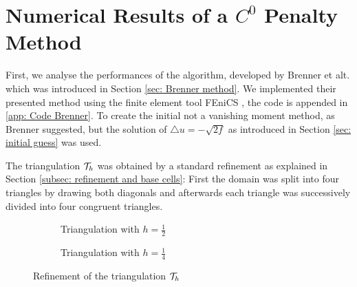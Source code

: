 
\section{Numerical Results of a $C^0$ Penalty Method}\label{sec: numerical results brenner}



First, we analyse the performances of the algorithm, developed by Brenner et alt. \cite{BGN+2011} which was introduced in Section \ref{sec: Brenner method}.
We implemented their presented method using the finite element tool FEniCS \cite{FEniCS}, the code is appended in \ref{app: Code Brenner}. 
To create the initial not a vanishing moment method, as Brenner suggested, but the solution of $\triangle u = -\sqrt{2f}$ as introduced in Section \ref{sec: initial guess} was used. 

The triangulation $\mathcal{T}_h$ was obtained by a standard refinement as explained in Section \ref{subsec: refinement and base cells}: First the domain was split into four triangles by drawing both diagonals and afterwards each triangle was successively divided into four congruent triangles.
\begin{figure}[H]
	\centering
	\begin{subfigure}{0.45\textwidth}
		\centering
		\edef \n {2}
		
		\caption{Triangulation with $h=\frac 1 2$}
		\label{fig: grid1}
	\end{subfigure}
	\begin{subfigure}{0.45\textwidth}
		\centering
		\edef \n {4}
		
		\caption{Triangulation with $h=\frac 1 4$}
		\label{fig: grid}
	\end{subfigure}	
	\caption{Refinement of the triangulation $\mathcal{T}_h$}
	\label{fig: grids}
\end{figure}

